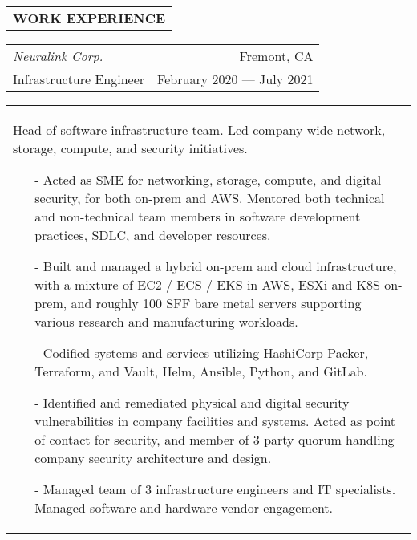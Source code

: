\begin{tabularx}{\textwidth}{L}
    \textbf{WORK EXPERIENCE}
\end{tabularx}

\begin{tabularx}{\textwidth}{L R}
    \normalsize\textit{Neuralink Corp.} & Fremont, CA \\
    \hspace{10pt}Infrastructure Engineer & February 2020 --- July 2021 \\
\end{tabularx}
\begin{tabularx}{\textwidth}{X}
    \vspace{1pt}
    Head of software infrastructure team. Led company-wide network, storage, compute, and security initiatives.
    \begin{itemize}
        \itemsep{}
        \item[-] Acted as SME for networking, storage, compute, and digital security, for both on-prem and AWS. Mentored both technical and non-technical team members in software development practices, SDLC, and developer resources.
        \item[-] Built and managed a hybrid on-prem and cloud infrastructure, with a mixture of EC2 / ECS / EKS in AWS, ESXi and K8S on-prem, and roughly 100 SFF bare metal servers supporting various research and manufacturing workloads.
        \item[-] Codified systems and services utilizing HashiCorp Packer, Terraform, and Vault, Helm, Ansible, Python, and GitLab.
        \item[-] Identified and remediated physical and digital security vulnerabilities in company facilities and systems. Acted as point of contact for security, and member of 3 party quorum handling company security architecture and design.
        \item[-] Managed team of 3 infrastructure engineers and IT specialists. Managed software and hardware vendor engagement.
    \end{itemize}
\end{tabularx}

